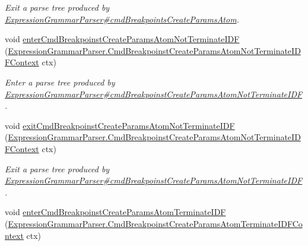 \begin{DoxyCompactItemize}
\begin{DoxyCompactList}\small\item\em Exit a parse tree produced by \hyperlink{classgov_1_1nasa_1_1jpf_1_1inspector_1_1server_1_1expression_1_1parser_1_1_expression_grammar_parser_af5febf5689be29b485c8497738ef35fc}{Expression\+Grammar\+Parser\#cmd\+Breakpoints\+Create\+Params\+Atom}. \end{DoxyCompactList}\item 
void \hyperlink{interfacegov_1_1nasa_1_1jpf_1_1inspector_1_1server_1_1expression_1_1parser_1_1_expression_grammar_listener_a3568f4564ea17380b55ba504bbef788b}{enter\+Cmd\+Breakpoinst\+Create\+Params\+Atom\+Not\+Terminate\+I\+DF} (\hyperlink{classgov_1_1nasa_1_1jpf_1_1inspector_1_1server_1_1expression_1_1parser_1_1_expression_grammar_paee196826319d0ea00470866a7ffd8d7b}{Expression\+Grammar\+Parser.\+Cmd\+Breakpoinst\+Create\+Params\+Atom\+Not\+Terminate\+I\+D\+F\+Context} ctx)
\begin{DoxyCompactList}\small\item\em Enter a parse tree produced by \hyperlink{classgov_1_1nasa_1_1jpf_1_1inspector_1_1server_1_1expression_1_1parser_1_1_expression_grammar_parser_a877ec76515f792b811174f247de762a6}{Expression\+Grammar\+Parser\#cmd\+Breakpoinst\+Create\+Params\+Atom\+Not\+Terminate\+I\+DF}. \end{DoxyCompactList}\item 
void \hyperlink{interfacegov_1_1nasa_1_1jpf_1_1inspector_1_1server_1_1expression_1_1parser_1_1_expression_grammar_listener_a11b3d5deac3aed6c5e83428aad7dd82c}{exit\+Cmd\+Breakpoinst\+Create\+Params\+Atom\+Not\+Terminate\+I\+DF} (\hyperlink{classgov_1_1nasa_1_1jpf_1_1inspector_1_1server_1_1expression_1_1parser_1_1_expression_grammar_paee196826319d0ea00470866a7ffd8d7b}{Expression\+Grammar\+Parser.\+Cmd\+Breakpoinst\+Create\+Params\+Atom\+Not\+Terminate\+I\+D\+F\+Context} ctx)
\begin{DoxyCompactList}\small\item\em Exit a parse tree produced by \hyperlink{classgov_1_1nasa_1_1jpf_1_1inspector_1_1server_1_1expression_1_1parser_1_1_expression_grammar_parser_a877ec76515f792b811174f247de762a6}{Expression\+Grammar\+Parser\#cmd\+Breakpoinst\+Create\+Params\+Atom\+Not\+Terminate\+I\+DF}. \end{DoxyCompactList}\item 
void \hyperlink{interfacegov_1_1nasa_1_1jpf_1_1inspector_1_1server_1_1expression_1_1parser_1_1_expression_grammar_listener_ad03e320fae8be37153c69d3f5b730872}{enter\+Cmd\+Breakpoinst\+Create\+Params\+Atom\+Terminate\+I\+DF} (\hyperlink{classgov_1_1nasa_1_1jpf_1_1inspector_1_1server_1_1expression_1_1parser_1_1_expression_grammar_pa33db42909734e187834b73b54c5beb59}{Expression\+Grammar\+Parser.\+Cmd\+Breakpoinst\+Create\+Params\+Atom\+Terminate\+I\+D\+F\+Context} ctx)

\end{DoxyCompactItemize}

